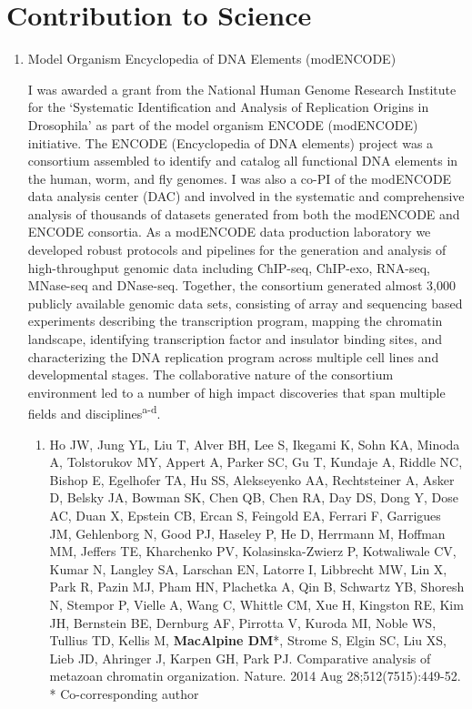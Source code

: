 \documentclass{nihbiosketch}
\begin{document}
\section{Contribution to Science}

\begin{enumerate}


\item Model Organism Encyclopedia of DNA Elements (modENCODE)

I was awarded a grant from the National Human Genome Research Institute for the ‘Systematic Identification and Analysis of Replication Origins in Drosophila’ as part of the model organism ENCODE (modENCODE) initiative. The ENCODE (Encyclopedia of DNA elements) project was a consortium assembled to identify and catalog all functional DNA elements in the human, worm, and fly genomes. I was also a co-PI of the modENCODE data analysis center (DAC) and involved in the systematic and comprehensive analysis of thousands of datasets generated from both the modENCODE and ENCODE consortia.  As a modENCODE data production laboratory we developed robust protocols and pipelines for the generation and analysis of high-throughput genomic data including ChIP-seq, ChIP-exo, RNA-seq, MNase-seq and DNase-seq.  Together, the consortium generated almost 3,000 publicly available genomic data sets, consisting of array and sequencing based experiments describing the transcription program, mapping the chromatin landscape, identifying transcription factor and insulator binding sites, and characterizing the DNA replication program across multiple cell lines and developmental stages.  The collaborative nature of the consortium environment led to a number of high impact discoveries that span multiple fields and disciplines\textsuperscript{a-d}.

  
\begin{enumerate}
\setlength\itemsep{0.35em}

\item Ho JW, Jung YL, Liu T, Alver BH, Lee S, Ikegami K, Sohn KA, Minoda A, Tolstorukov MY, Appert A, Parker SC, Gu T, Kundaje A, Riddle NC, Bishop E, Egelhofer TA, Hu SS, Alekseyenko AA, Rechtsteiner A, Asker D, Belsky JA, Bowman SK, Chen QB, Chen RA, Day DS, Dong Y, Dose AC, Duan X, Epstein CB, Ercan S, Feingold EA, Ferrari F, Garrigues JM, Gehlenborg N, Good PJ, Haseley P, He D, Herrmann M, Hoffman MM, Jeffers TE, Kharchenko PV, Kolasinska-Zwierz P, Kotwaliwale CV, Kumar N, Langley SA, Larschan EN, Latorre I, Libbrecht MW, Lin X, Park R, Pazin MJ, Pham HN, Plachetka A, Qin B, Schwartz YB, Shoresh N, Stempor P, Vielle A, Wang C, Whittle CM, Xue H, Kingston RE, Kim JH, Bernstein BE, Dernburg AF, Pirrotta V, Kuroda MI, Noble WS, Tullius TD, Kellis M, \textbf{MacAlpine DM}*, Strome S, Elgin SC, Liu XS, Lieb JD, Ahringer J, Karpen GH, Park PJ. Comparative analysis of metazoan chromatin organization. Nature. 2014 Aug 28;512(7515):449-52. * Co-corresponding author


\end{enumerate}
\end{enumerate}
\end{document}
